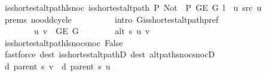\begin{isabellebody}
\ is{\isacharunderscore}{\kern0pt}shortest{\isacharunderscore}{\kern0pt}alt{\isacharunderscore}{\kern0pt}path{\isacharunderscore}{\kern0pt}l{\isacharunderscore}{\kern0pt}snoc{\isacharcolon}{\kern0pt}\ {\isachardoublequoteopen}is{\isacharunderscore}{\kern0pt}shortest{\isacharunderscore}{\kern0pt}alt{\isacharunderscore}{\kern0pt}path\ P{\isacharprime}{\kern0pt}{\isacharprime}{\kern0pt}\ {\isacharparenleft}{\kern0pt}Not\ {\isasymcirc}\ P{\isacharprime}{\kern0pt}{\isacharprime}{\kern0pt}{\isacharparenright}{\kern0pt}\ {\isacharparenleft}{\kern0pt}G{\isachardot}{\kern0pt}E\ G{\isacharparenright}{\kern0pt}\ {\isacharparenleft}{\kern0pt}l\ {\isacharat}{\kern0pt}\ {\isacharbrackleft}{\kern0pt}u{\isacharbrackright}{\kern0pt}{\isacharparenright}{\kern0pt}\ src\ u{\isachardoublequoteclose}\isanewline
\ \ \ \ \ \ \ \ \isamarkupfalse%
\ {\isachardoublequoteopen}{}{\isachardot}{\kern0pt}prems{\isachardoublequoteclose}{\isacharparenleft}{\kern0pt}{}{\isacharparenright}{\kern0pt}\ no{\isacharunderscore}{\kern0pt}odd{\isacharunderscore}{\kern0pt}cycle\isanewline
\ \ \ \ \ \ \ \ \isamarkupfalse%
\ {\isacharparenleft}{\kern0pt}intro\ G{\isachardot}{\kern0pt}is{\isacharunderscore}{\kern0pt}shortest{\isacharunderscore}{\kern0pt}alt{\isacharunderscore}{\kern0pt}path{\isacharunderscore}{\kern0pt}pref{\isacharparenright}{\kern0pt}\isanewline
\ \ \ \ \ \ \isamarkupfalse%
\isanewline
\ \ \ \ \ \ \ \ {\isachardoublequoteopen}{\isacharbraceleft}{\kern0pt}u{\isacharcomma}{\kern0pt}\ v{\isacharbraceright}{\kern0pt}\ {\isasymin}\ G{\isachardot}{\kern0pt}E\ G{\isachardoublequoteclose}\isanewline
\ \ \ \ \ \ \ \ {\isachardoublequoteopen}alt\ s\ u\ v{\isachardoublequoteclose}\isanewline
\ \ \ \ \ \ \ \ \isamarkupfalse%
\ is{\isacharunderscore}{\kern0pt}shortest{\isacharunderscore}{\kern0pt}alt{\isacharunderscore}{\kern0pt}path{\isacharunderscore}{\kern0pt}l{\isacharunderscore}{\kern0pt}snoc{\isacharunderscore}{\kern0pt}snoc\ False\isanewline
\ \ \ \ \ \ \ \ \isamarkupfalse%
\ {\isacharparenleft}{\kern0pt}fastforce\ dest{\isacharcolon}{\kern0pt}\ is{\isacharunderscore}{\kern0pt}shortest{\isacharunderscore}{\kern0pt}alt{\isacharunderscore}{\kern0pt}pathD{\isacharparenleft}{\kern0pt}{}{\isacharparenright}{\kern0pt}\ dest{\isacharcolon}{\kern0pt}\ alt{\isacharunderscore}{\kern0pt}path{\isacharunderscore}{\kern0pt}snoc{\isacharunderscore}{\kern0pt}snocD{\isacharparenright}{\kern0pt}{\isacharplus}{\kern0pt}\isanewline
\ \ \ \ \ \ \isamarkupfalse%
\ {\isachardoublequoteopen}d\ {\isacharparenleft}{\kern0pt}parent\ s{\isacharparenright}{\kern0pt}\ v\ {\isasymle}\ d\ {\isacharparenleft}{\kern0pt}parent\ s{\isacharparenright}{\kern0pt}\ u\ {\isacharplus}{\kern0pt}\ {}{\isachardoublequoteclose}\isanewline

\end{isabellebody}
